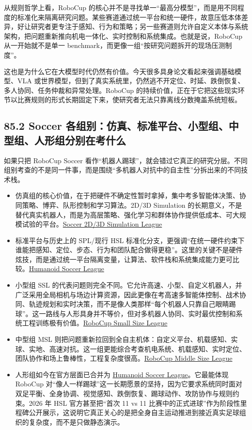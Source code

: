 从规则哲学上看，RoboCup 的核心并不是寻找单一“最高分模型”，而是用不同程度的标准化来隔离研究问题。某些赛道通过统一平台和统一硬件，故意压低本体差异，好让研究者更专注于感知、行为和策略；另一些赛道则允许自定义本体与系统架构，把问题重新推向机电一体化、实时控制和系统集成。也就是说，RoboCup 从一开始就不是单一 benchmark，而更像一组“按研究问题拆开的现场压测制度”。

这也是为什么它在大模型时代仍然有价值。今天很多具身论文看起来强调基础模型、VLA 或世界模型，但到了真实系统里，仍然逃不开定位、时延、跌倒恢复、多人协同、任务仲裁和异常处理。RoboCup 的持续价值，正在于它把这些现实环节以比赛规则的形式长期固定下来，使研究者无法只靠离线分数掩盖系统短板。

\subsection*{85.2 Soccer 各组别：仿真、标准平台、小型组、中型组、人形组分别在考什么}


如果只把 RoboCup Soccer 看作“机器人踢球”，就会错过它真正的研究分层。不同组别考查的不是同一件事，而是围绕“多机器人对抗中的自主性”分拆出来的不同技术栈。

\begin{itemize}
\item 仿真组的核心价值，在于把硬件不确定性暂时拿掉，集中考多智能体决策、协同策略、博弈、队形控制和学习算法。2D/3D Simulation 的长期意义，不是替代真实机器人，而是为高层策略、强化学习和群体协作提供低成本、可大规模试验的平台。\href{https://ssim.robocup.org/}{Soccer 2D/3D Simulation League}
\item 标准平台与历史上的 SPL/现行 HSL 标准化分支，更强调“在统一硬件约束下谁能把感知、定位、步态、行为和团队配合做得更稳”。这里的关键不是硬件炫技，而是通过统一平台隔离变量，让算法、软件栈和系统集成能力更可比较。\href{https://hsl.robocup.org/}{Humanoid Soccer League}
\item 小型组 SSL 的代表问题则完全不同。它允许高速、小型、自定义机器人，并广泛采用全局相机与场边计算资源，因此更像在考高速多智能体控制、战术协同、轨迹规划和实时决策，而不是像人类那样“每个机器人只靠自己眼睛踢球”。这一路线与人形具身并不等价，但对多机器人协同、实时最优控制和系统工程训练极有价值。\href{https://ssl.robocup.org/}{RoboCup Small Size League}
\item 中型组 MSL 则把问题重新拉回到全自主机体：自定义平台、机载感知、实球、实地、高速对抗。这一组更能综合考查机电系统、机载感知、实时定位、团队协作和场上鲁棒性，工程复杂度很高。\href{https://msl.robocup.org/}{RoboCup Middle Size League}
\item 人形组如今在官方层面已合并为 \href{https://hsl.robocup.org/}{Humanoid Soccer League}。它最能体现 RoboCup 对“像人一样踢球”这一长期愿景的坚持，因为它要求系统同时面对双足平衡、全身协调、视觉感知、跌倒恢复、踢球动作、攻防协作与规则约束。2026 年 HSL 官方甚至把“首次 11 vs 11 比赛中的正式进球”作为阶段性里程碑公开展示，这说明它真正关心的是把全身自主运动推进到接近真实足球组织的复杂度，而不是只做静态演示。
\end{itemize}

